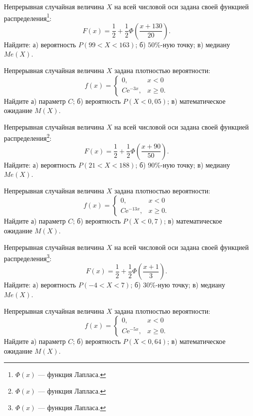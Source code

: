\vfill

\newpage\setcounter{zad}{0}

\z Непрерывная случайная величина $X$ на всей числовой оси задана своей функцией распределения\footnote{$\Phi(x)$ --- функция Лапласа.}: $$ F(x) = \frac{1}{2} + \frac{1}{2}\Phi\left( \frac{x + 130}{20} \right). $$ Найдите: а) вероятность $P(99 < X < 163)$; б) $50\%$-ную точку; в) медиану $Me(X)$.


\vfill

\z Непрерывная случайная величина $X$ задана плотностью вероятности: $$ f(x) = \begin{cases}0, & x < 0 \\ C\mathrm{e}^{-3x}, & x \geqslant 0.\end{cases} $$ Найдите а) параметр $C$; б) вероятность $P(X < 0{,}05)$; в) математическое ожидание $M(X)$.
 

\vfill

\newpage\setcounter{zad}{0}

\z Непрерывная случайная величина $X$ на всей числовой оси задана своей функцией распределения\footnote{$\Phi(x)$ --- функция Лапласа.}: $$ F(x) = \frac{1}{2} + \frac{1}{2}\Phi\left( \frac{x + 90}{50} \right). $$ Найдите: а) вероятность $P(21 < X < 188)$; б) $90\%$-ную точку; в) медиану $Me(X)$.


\vfill

\z Непрерывная случайная величина $X$ задана плотностью вероятности: $$ f(x) = \begin{cases}0, & x < 0 \\ C\mathrm{e}^{-13x}, & x \geqslant 0.\end{cases} $$ Найдите а) параметр $C$; б) вероятность $P(X < 0{,}7)$; в) математическое ожидание $M(X)$.
 

\vfill

\newpage\setcounter{zad}{0}

\z Непрерывная случайная величина $X$ на всей числовой оси задана своей функцией распределения\footnote{$\Phi(x)$ --- функция Лапласа.}: $$ F(x) = \frac{1}{2} + \frac{1}{2}\Phi\left( \frac{x + 1}{3} \right). $$ Найдите: а) вероятность $P(-4 < X < 7)$; б) $30\%$-ную точку; в) медиану $Me(X)$.


\vfill

\z Непрерывная случайная величина $X$ задана плотностью вероятности: $$ f(x) = \begin{cases}0, & x < 0 \\ C\mathrm{e}^{-5x}, & x \geqslant 0.\end{cases} $$ Найдите а) параметр $C$; б) вероятность $P(X < 0{,}64)$; в) математическое ожидание $M(X)$.
 

